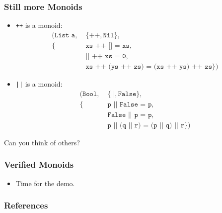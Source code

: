 \documentclass[hyperref={colorlinks = true,linkcolor = blue, citecolor = blue, urlcolor = blue}]{beamer}
\begin{document}
\begin{frame}[fragile]
  \frametitle{Still more Monoids}
  \begin{itemize}
    \item \texttt{++} is a monoid: \begin{align*}
                                (\texttt{List a},
                                 \;&\{\texttt{++},
                                      \texttt{Nil}\}, \\
    \{&\texttt{xs ++ [] = xs}, \\
    &\texttt{[] ++ xs = 0}, \\
    &\texttt{xs ++ (ys ++ zs) = (xs ++ ys) ++ zs} \})
                                 \end{align*}
    \item \texttt{||} is a monoid: \begin{align*}
                                (\texttt{Bool},
                                 \;&\{\texttt{||},
                                      \texttt{False}\}, \\
    \{&\texttt{p || False = p}, \\
    &\texttt{False || p = p}, \\
    &\texttt{p || (q || r) = (p || q) || r} \})
                                 \end{align*}
  \end{itemize}
  Can you think of others?
\end{frame}

\begin{frame}[fragile]
  \frametitle{Verified Monoids}
  \begin{itemize}
    \item Time for the demo.
  \end{itemize}
\end{frame}


\begin{frame}[fragile]
\frametitle{References}
{}
\end{frame}
\end{document}
